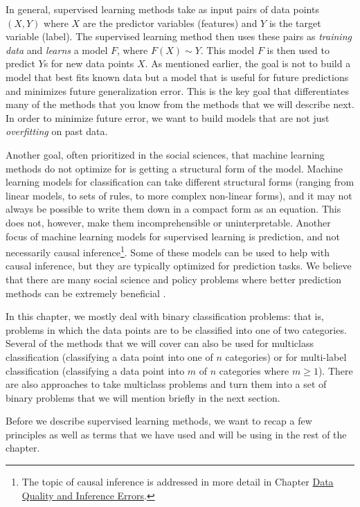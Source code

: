 \documentclass[]{krantz}
\begin{document}
In general, supervised learning methods take as input pairs of data
points \((X,Y)\) where \(X\) are the predictor variables (features) and
\(Y\) is the target variable (label). The supervised learning method
then uses these pairs as \emph{training data} and \emph{learns} a model
\(F\), where \(F(X)\sim Y\). This model \(F\) is then used to predict
\(Y\)s for new data points \(X\). As mentioned earlier, the goal is not
to build a model that best fits known data but a model that is useful
for future predictions and minimizes future generalization error. This
is the key goal that differentiates many of the methods that you know
from the methods that we will describe next. In order to minimize future
error, we want to build models that are not just \emph{overfitting} on
past data.

Another goal, often prioritized in the social sciences, that machine
learning methods do not optimize for is getting a structural form of the
model. Machine learning models for classification can take different
structural forms (ranging from linear models, to sets of rules, to more
complex non-linear forms), and it may not always be possible to write
them down in a compact form as an equation. This does not, however, make
them incomprehensible or uninterpretable. Another focus of machine
learning models for supervised learning is prediction, and not
necessarily causal inference\footnote{The topic of causal inference is
  addressed in more detail in Chapter
  \protect\hyperlink{chap:errors}{Data Quality and Inference Errors}.}.
Some of these models can be used to help with causal inference, but they
are typically optimized for prediction tasks. We believe that there are
many social science and policy problems where better prediction methods
can be extremely beneficial \citep{Kleinberg2015}.

In this chapter, we mostly deal with binary classification problems:
that is, problems in which the data points are to be classified into one
of two categories. Several of the methods that we will cover can also be
used for multiclass classification (classifying a data point into one of
\(n\) categories) or for multi-label classification (classifying a data
point into \(m\) of \(n\) categories where \(m\ge1\)). There are also
approaches to take multiclass problems and turn them into a set of
binary problems that we will mention briefly in the next section.

Before we describe supervised learning methods, we want to recap a few
principles as well as terms that we have used and will be using in the
rest of the chapter.
\end{document}
